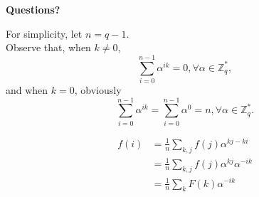 \documentclass{beamer}	%
\newcommand{\Z}{\mathbb{Z}}
\theoremstyle{plain}
\theoremstyle{definition}
\theoremstyle{remark}
\numberwithin{equation}{section}
\begin{document}
\begin{frame}
\begin{center} {\bfseries \Large Questions?} \end{center}
\end{frame}

\begin{frame}
For simplicity, let $n = q - 1$.\\
Observe that, when $k \ne 0$, 
\[
\sum_{i=0}^{n-1}\alpha^{ik} = 0, \forall \alpha \in \Z_q^*,
\]
and when $k = 0$, obviously
\[
\sum_{i=0}^{n-1}\alpha^{ik} = \sum_{i=0}^{n-1}\alpha^0 = n, \forall \alpha \in \Z_q^*.
\]
\end{frame}

\begin{frame}
\begin{align*}
f(i) & = \frac{1}{n}\sum_{k,j}{f(j)\alpha^{kj-ki}} \\
	 & = \frac{1}{n}\sum_{k,j}{f(j)\alpha^{kj}\alpha^{-ik}} \\
	 & = \frac{1}{n}\sum_{k}{F(k)\alpha^{-ik}}
\end{align*}
\end{frame}
\end{document}
